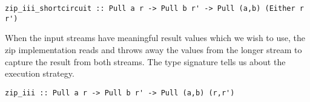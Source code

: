 \begin{lstlisting}
zip_iii_shortcircuit :: Pull a r -> Pull b r' -> Pull (a,b) (Either r r')
\end{lstlisting}

When the input streams have meaningful result values which we wish to use, the zip implementation reads and throws away the values from the longer stream to capture the result from both streams.
The type signature tells us about the execution strategy.

\begin{lstlisting}
zip_iii :: Pull a r -> Pull b r' -> Pull (a,b) (r,r')
\end{lstlisting}

% 
% 
% 
% 
% 
% 
